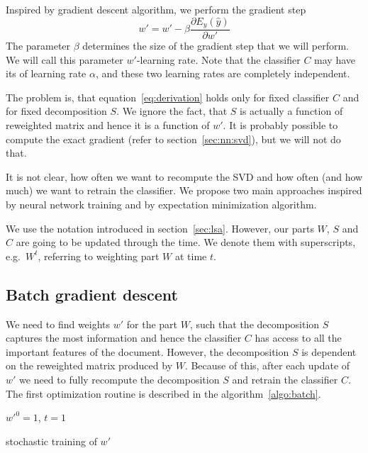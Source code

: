     Inspired by gradient descent algorithm, we perform the gradient step 
    \begin{equation}
        w' = w' - \beta \frac{\partial E_y(\hat{y})}{\partial w'}
    \end{equation}
    The parameter $\beta$ determines the size of the gradient step that we will perform.
    We will call this parameter $w'$-learning rate. 
    Note that the classifier $C$ may have its of learning rate $\alpha$, and these two learning rates are completely independent.
    
    The problem is, that equation~\ref{eq:derivation} holds only for fixed classifier $C$ and for fixed decomposition $S$. 
    We ignore the fact, that $S$ is actually a function of reweighted matrix and hence it is a function of $w'$.
    It is probably possible to compute the exact gradient (refer to section~\ref{sec:nn:svd}), but we will not do that.
    
    It is not clear, how often we want to recompute the SVD and how often (and how much) we want to retrain the classifier.
    We propose two main approaches inspired by neural network training and by 
    expectation minimization algorithm.
    
    We use the notation introduced in section~\ref{sec:lsa}.
    However, our parts $W$, $S$ and $C$ are going to be updated through the time. We denote them with superscripts, e.g.~$W^t$, referring to weighting part $W$ at time $t$.
    
    \subsection{Batch gradient descent}
    
    We need to find weights $w'$ for the part $W$, 
    such that the decomposition $S$ captures the most information and hence the classifier $C$ has access to all the important features of the document.
    However, the decomposition $S$ is dependent on the reweighted matrix produced by $W$. 
    Because of this, after each update of $w'$ we need to fully recompute the decomposition $S$ and retrain the classifier $C$.
    The first optimization routine is described in the algorithm~\ref{algo:batch}.
    
    \medskip
    
    \begin{algorithm}[H]
        $w'^0 = 1$, $t=1$\;
        \caption{stochastic training of $w'$} \label{algo:batch}
    \end{algorithm}
    
